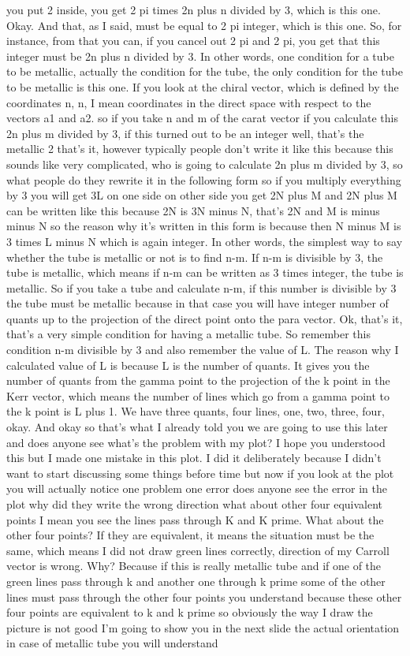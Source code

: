 you put 2 inside, you get 2 pi times 2n plus n divided by 3, which is this one. Okay. And that, as I said, must be equal to 2 pi integer, which is this one. So, for instance, from that you can, if you cancel out 2 pi and 2 pi, you get that this integer must be 2n plus n divided by 3. In other words, one condition for a tube to be metallic, actually the condition for the tube, the only condition for the tube to be metallic is this one. If you look at the chiral vector, which is defined by the coordinates n, n, I mean coordinates in the direct space with respect to the vectors a1 and a2. so if you take n and m of the carat vector if you calculate this 2n plus m divided by 3, if this turned out to be an integer well, that's the metallic 2 that's it, however typically people don't write it like this because this sounds like very complicated, who is going to calculate 2n plus m divided by 3, so what people do they rewrite it in the following form so if you multiply everything by 3 you will get 3L on one side on other side you get 2N plus M and 2N plus M can be written like this because 2N is 3N minus N, that's 2N and M is minus minus N so the reason why it's written in this form is because then N minus M is 3 times L minus N which is again integer. In other words, the simplest way to say whether the tube is metallic or not is to find n-m. If n-m is divisible by 3, the tube is metallic, which means if n-m can be written as 3 times integer, the tube is metallic. So if you take a tube and calculate n-m, if this number is divisible by 3 the tube must be metallic because in that case you will have integer number of quants up to the projection of the direct point onto the para vector. Ok, that's it, that's a very simple condition for having a metallic tube. So remember this condition n-m divisible by 3 and also remember the value of L. The reason why I calculated value of L is because L is the number of quants. It gives you the number of quants from the gamma point to the projection of the k point in the Kerr vector, which means the number of lines which go from a gamma point to the k point is L plus 1. We have three quants, four lines, one, two, three, four, okay. And okay so that's what I already told you we are going to use this later and does anyone see what's the problem with my plot? I hope you understood this but I made one mistake in this plot. I did it deliberately because I didn't want to start discussing some things before time but now if you look at the plot you will actually notice one problem one error does anyone see the error in the plot why did they write the wrong direction what about other four equivalent points I mean you see the lines pass through K and K prime. What about the other four points? If they are equivalent, it means the situation must be the same, which means I did not draw green lines correctly, direction of my Carroll vector is wrong. Why? Because if this is really metallic tube and if one of the green lines pass through k and another one through k prime some of the other lines must pass through the other four points you understand because these other four points are equivalent to k and k prime so obviously the way I draw the picture is not good I'm going to show you in the next slide the actual orientation in case of metallic tube you will understand 